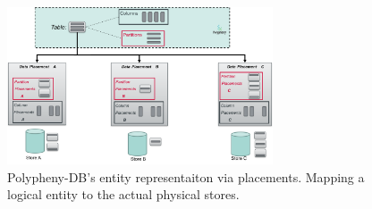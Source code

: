 \begin{figure}[t]
    \centering
    \includegraphics[width=0.7\textwidth]{Figures/data_placement.png}
    \caption{Polypheny-DB's entity representaiton via placements. Mapping a logical entity to the actual physical stores.}
    \label{fig:placements}
\end{figure}

